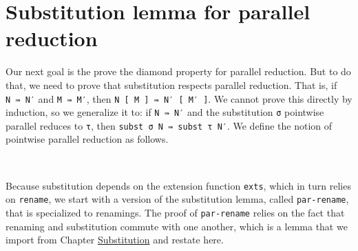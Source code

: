 \hypertarget{substitution-lemma-for-parallel-reduction}{%
\section{Substitution lemma for parallel
reduction}\label{substitution-lemma-for-parallel-reduction}}

Our next goal is the prove the diamond property for parallel reduction.
But to do that, we need to prove that substitution respects parallel
reduction. That is, if \texttt{N\ ⇛\ N′} and \texttt{M\ ⇛\ M′}, then
\texttt{N\ {[}\ M\ {]}\ ⇛\ N′\ {[}\ M′\ {]}}. We cannot prove this
directly by induction, so we generalize it to: if \texttt{N\ ⇛\ N′} and
the substitution \texttt{σ} pointwise parallel reduces to \texttt{τ},
then \texttt{subst\ σ\ N\ ⇛\ subst\ τ\ N′}. We define the notion of
pointwise parallel reduction as follows.

\begin{fence}
\begin{code}%
\>[0]\AgdaSpace{}%
\AgdaSymbol{:}\AgdaSpace{}%
\AgdaSpace{}%
\AgdaSymbol{\}}\AgdaSpace{}%
\AgdaSpace{}%
\AgdaSpace{}%
\AgdaSpace{}%
\AgdaSpace{}%
\AgdaSpace{}%
\AgdaSpace{}%
\AgdaSpace{}%
\AgdaSpace{}%
\AgdaSpace{}%
\<%
\\
\>[0]\AgdaSpace{}%
\AgdaSymbol{\{}\AgdaSymbol{\}\{}\AgdaSymbol{\}}\AgdaSpace{}%
\AgdaSpace{}%
\AgdaSpace{}%
\AgdaSymbol{=}\AgdaSpace{}%
\AgdaSymbol{\}\{}\AgdaSpace{}%
\AgdaSymbol{:}\AgdaSpace{}%
\AgdaSpace{}%
\AgdaSpace{}%
\AgdaSymbol{\}}\AgdaSpace{}%
\AgdaSpace{}%
\AgdaSpace{}%
\AgdaSpace{}%
\AgdaSpace{}%
\AgdaSpace{}%
\<%
\end{code}
\end{fence}

Because substitution depends on the extension function \texttt{exts},
which in turn relies on \texttt{rename}, we start with a version of the
substitution lemma, called \texttt{par-rename}, that is specialized to
renamings. The proof of \texttt{par-rename} relies on the fact that
renaming and substitution commute with one another, which is a lemma
that we import from Chapter
\protect\hyperlink{Substitution}{Substitution} and restate here.

